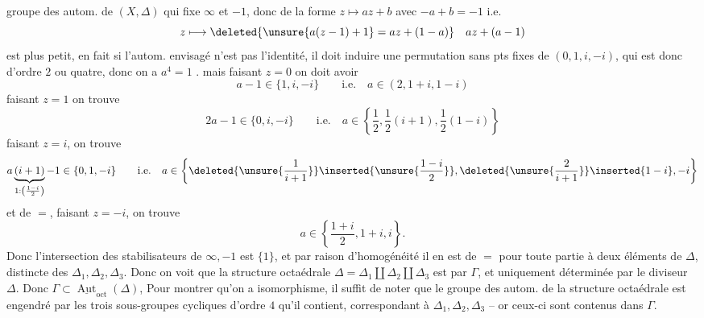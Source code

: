 groupe des autom. de $(X,\Delta)$ qui fixe $\infty$ et $-1$, donc  de la forme $z\longmapsto az+b$ avec $-a+b=-1$ i.e.
\[
z\longmapsto\deleted{\unsure{a(z-1)+1}=az+(1-a)}\quad az+(a-1)
\]
est plus petit, en fait si l'autom. envisagé n'est pas l'identité, il doit induire une permutation sans pts fixes de $(0,1,i,-i)$, qui est donc d'ordre $2$ ou quatre, donc on a $a^4=1$ .
mais faisant $z=0$ on doit avoir
\[
a-1\in\{1,i,-i\}\qquad\text{i.e.}\quad a\in(2,1+i,1-i)
\]
faisant $z=1$ on trouve
\[
2a-1\in\{0,i,-i\}\qquad\text{i.e.}\quad a\in\left\{\frac12,\frac12(i+1),\frac12(1-i)\right\}
\]
faisant $z=i$, on trouve
\[
a\underbrace{(i+1)}_{1:\left(\frac{1-i}{2}\right)}-1\in\{0,1,-i\}
\qquad\text{i.e.}\quad
 a\in\left\{\deleted{\unsure{\frac1{i+1}}}\inserted{\unsure{\frac{1-i}{2}}},\deleted{\unsure{\frac2{i+1}}}\inserted{1-i},-i\right\}
\]
et de $=$, faisant $z=-i$, on trouve
\[
a\in\left\{\frac{1+i}{2},1+i,i\right\}.
\]
Donc l'intersection des stabilisateurs de $\infty,-1$ est $\{1\}$, et par raison d'homogénéité il en est de $=$ pour toute partie à deux éléments de $\Delta$, distincte des $\Delta_1,\Delta_2,\Delta_3$. Donc on voit que la structure octaédrale $\Delta=\Delta_1\amalg\Delta_2\amalg\Delta_3$ est  par $\Gamma$, et uniquement déterminée par le diviseur $\Delta$. Donc $\Gamma\subset\underline{\operatorname{Aut}}_{\mathrm{oct}}(\Delta)$, Pour montrer qu'on a isomorphisme, il suffit de noter que le groupe des autom.  de la structure octaédrale est engendré par les trois sous-groupes cycliques d'ordre $4$  qu'il contient, correspondant à $\Delta_1,\Delta_2,\Delta_3$ -- or ceux-ci sont contenus dans $\Gamma$.
